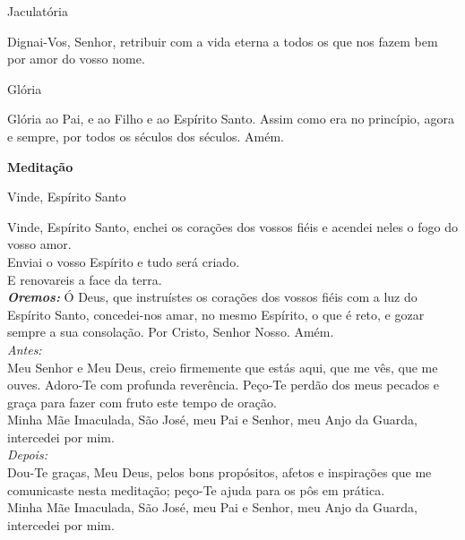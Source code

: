 \documentclass{book}
\begin{document}
\begin{center}
    Jaculatória
\end{center}
\begin{flushleft}
    Dignai-Vos, Senhor, retribuir com a vida eterna a todos os que nos fazem bem por amor do vosso nome.
\end{flushleft}
\begin{center}
    Glória
\end{center}
\begin{flushleft}
    Glória ao Pai, e ao Filho e ao Espírito Santo. Assim como era no princípio, agora e sempre, por todos os séculos dos séculos. Amém.
\end{flushleft}
\newpage
\begin{center}
    \textbf{Meditação}
\end{center}
\begin{center}
    Vinde, Espírito Santo
\end{center}
\begin{flushleft}
    Vinde, Espírito Santo, enchei os corações dos vossos fiéis e acendei neles o fogo do vosso amor. \\
    \VbarRed{} Enviai o vosso Espírito e tudo será criado. \\
    \RbarRed{} E renovareis a face da terra.
    \vspace{.2cm} \\
    \textbf{\textit{Oremos:}} Ó Deus, que instruístes os corações dos vossos fiéis com a luz do Espírito Santo, concedei-nos amar, no mesmo Espírito, o que é reto, e gozar sempre a sua consolação. Por Cristo, Senhor Nosso. Amém.
    \vspace{.2cm} \\
    \textit{Antes:} \\ Meu Senhor e Meu Deus, creio firmemente que estás aqui, que me vês, que me ouves. Adoro-Te com profunda reverência. Peço-Te perdão dos meus pecados e graça para fazer com fruto este tempo de oração. \\ Minha Mãe Imaculada, São José, meu Pai e Senhor, meu Anjo da Guarda, intercedei por mim.
    \vspace{.2cm} \\
    \textit{Depois:} \\ Dou-Te graças, Meu Deus, pelos bons propósitos, afetos e inspirações que me comunicaste nesta meditação; peço-Te ajuda para os pôs em prática. \\ Minha Mãe Imaculada, São José, meu Pai e Senhor, meu Anjo da Guarda, intercedei por mim.
\end{flushleft}
\end{document}
